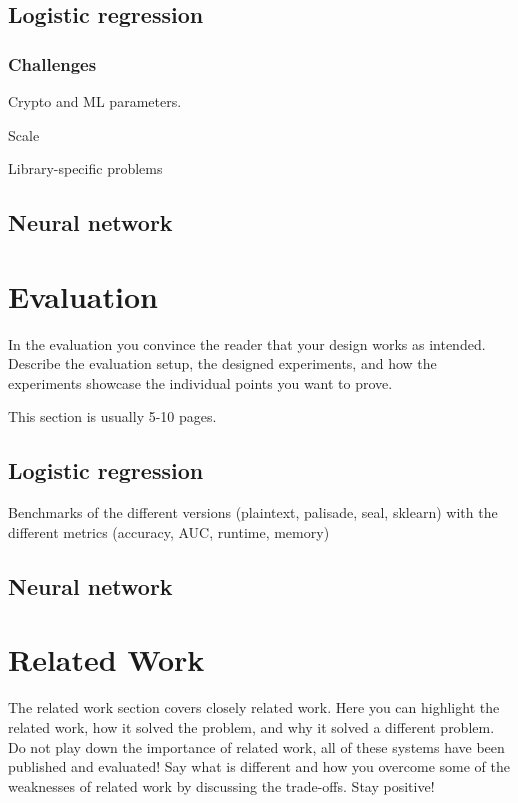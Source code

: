 \documentclass[a4paper,11pt,oneside]{report}
\begin{document}
\section{Logistic regression}

\subsection{Challenges}
Crypto and ML parameters.

Scale

Library-specific problems

\section{Neural network}



\chapter{Evaluation}

In the evaluation you convince the reader that your design works as intended.
Describe the evaluation setup, the designed experiments, and how the
experiments showcase the individual points you want to prove.

This section is usually 5-10 pages.

\section{Logistic regression}

Benchmarks of the different versions (plaintext, palisade, seal, sklearn) with the different metrics (accuracy, AUC, runtime, memory)

\section{Neural network}



\chapter{Related Work}

The related work section covers closely related work. Here you can highlight
the related work, how it solved the problem, and why it solved a different
problem. Do not play down the importance of related work, all of these
systems have been published and evaluated! Say what is different and how
you overcome some of the weaknesses of related work by discussing the 
trade-offs. Stay positive!
\end{document}
